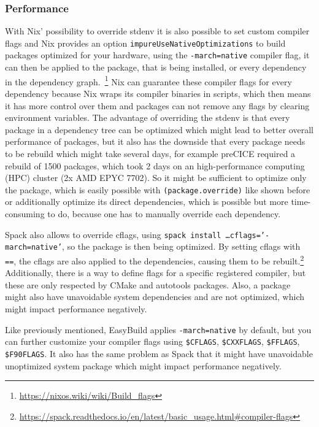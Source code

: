 \documentclass[conference,final,a4paper]{IEEEtran}
\begin{document}
\subsubsection{Performance}

With Nix' possibility to override stdenv it is also possible to set custom compiler flags and Nix provides an option \texttt{impureUseNativeOptimizations} to build packages optimized for your hardware, using the \texttt{-march=native} compiler flag, it can then be applied to the package, that is being installed, or every dependency in the dependency graph.~\footnote{\url{https://nixos.wiki/wiki/Build_flags}}
Nix can guarantee these compiler flags for every dependency because Nix wraps its compiler binaries in scripts, which then means it has more control over them and packages can not remove any flags by clearing environment variables.
The advantage of overriding the stdenv is that every package in a dependency tree can be optimized which might lead to better overall performance of packages, but it also has the downside that every package needs to be rebuild which might take several days, for example preCICE required a rebuild of 1500 packages, which took 2 days on an high-performance computing (HPC) cluster (2x AMD EPYC 7702).
So it might be sufficient to optimize only the package, which is easily possible with \texttt{(package.override)} like shown before or additionally optimize its direct dependencies, which is possible but more time-consuming to do, because one has to manually override each dependency.

Spack also allows to override cflags, using \texttt{spack install \ldots cflags='-march=native'}, so the package is then being optimized.
By setting cflags with \texttt{==}, the cflags are also applied to the dependencies, causing them to be rebuilt.\footnote{\url{https://spack.readthedocs.io/en/latest/basic_usage.html\#compiler-flags}}
Additionally, there is a way to define flags for a specific registered compiler, but these are only respected by CMake and autotools packages.
Also, a package might also have unavoidable system dependencies and are not optimized, which might impact performance negatively.

Like previously mentioned, EasyBuild applies \texttt{-march=native} by default, but you can further customize your compiler flags using \texttt{\$CFLAGS}, \texttt{\$CXXFLAGS}, \texttt{\$FFLAGS}, \texttt{\$F90FLAGS}.
It also has the same problem as Spack that it might have unavoidable unoptimized system package which might impact performance negatively.\\
\end{document}
